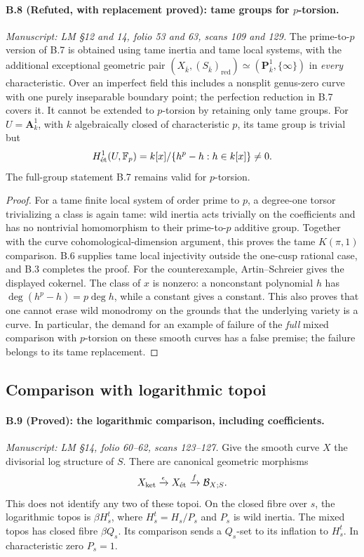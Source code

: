 \paragraph{B.8 (Refuted, with replacement proved): tame groups for $p$-torsion.}\label{B8}
\textit{Manuscript: LM \S12 and 14, folio 53 and 63, scans 109 and 129.}
The prime-to-$p$ version of B.7 is obtained using tame inertia
and tame local systems, with the additional exceptional geometric
pair $(X_{\overline k},(S_{\overline k})_{\mathrm{red}})
\simeq(\mathbf P^1_{\overline k},\{\infty\})$ in
\emph{every} characteristic. Over an imperfect field this includes
a nonsplit genus-zero curve with one purely inseparable boundary
point; the perfection reduction in B.7 covers it.
It cannot be extended to $p$-torsion by retaining only tame groups.
For $U=\mathbf A^1_k$, with $k$ algebraically closed of
characteristic $p$, its tame group is
trivial but
\[
 H^1_{\mathrm{\acute et}}(U,\mathbb F_p)=k[x]/\{h^p-h:h\in k[x]\}\ne0.
\]
The full-group statement B.7 remains valid for $p$-torsion.

\begin{proof}
For a tame finite local system of order prime to $p$, a
degree-one torsor trivializing a class is again tame: wild
inertia acts trivially on the coefficients and has no nontrivial
homomorphism to their prime-to-$p$ additive group. Together with
the curve cohomological-dimension argument, this proves the
tame $K(\pi,1)$ comparison. B.6 supplies tame local injectivity
outside the one-cusp rational case, and B.3 completes the proof.
For the counterexample, Artin--Schreier gives the displayed
cokernel. The class of $x$ is nonzero: a nonconstant polynomial
$h$ has $\deg(h^p-h)=p\deg h$, while a constant gives a constant.
This also proves that one cannot erase wild monodromy on the
grounds that the underlying variety is a curve. In particular,
the demand for an example of failure of the \emph{full} mixed
comparison with $p$-torsion on these smooth curves has a false
premise; the failure belongs to its tame replacement.
\end{proof}

\subsection{Comparison with logarithmic topoi}

\paragraph{B.9 (Proved): the logarithmic comparison, including coefficients.}\label{B9}
\textit{Manuscript: LM \S14, folio 60--62, scans 123--127.}
Give the smooth curve $X$ the divisorial log structure of $S$.
There are canonical geometric morphisms
\[
 X_{\mathrm{ket}}\xrightarrow{\epsilon}X_{\mathrm{\acute et}}
       \xrightarrow{f}\mathcal B_{X;S}.
\]
This does not identify any two of these topoi. On the closed
fibre over $s$, the logarithmic topos is $\beta H_s^t$, where
$H_s^t=H_s/P_s$ and $P_s$ is wild inertia. The mixed topos has
closed fibre $\beta Q_s$. Its comparison sends a $Q_s$-set to
its inflation to $H_s^t$. In characteristic zero $P_s=1$.


